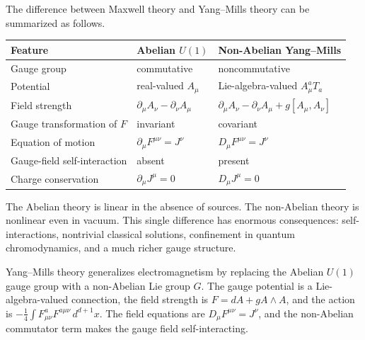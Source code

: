 The difference between Maxwell theory and Yang--Mills theory can be summarized
as follows.

\begin{center}
\begin{tabular}{lll}
\toprule
Feature & Abelian \(U(1)\) & Non-Abelian Yang--Mills \\
\midrule
Gauge group & commutative & noncommutative \\
Potential & real-valued \(A_\mu\) & Lie-algebra-valued \(A_\mu^aT_a\) \\
Field strength & \(\partial_\mu A_\nu-\partial_\nu A_\mu\) & \(\partial_\mu A_\nu-\partial_\nu A_\mu+g[A_\mu,A_\nu]\) \\
Gauge transformation of \(F\) & invariant & covariant \\
Equation of motion & \(\partial_\mu F^{\mu\nu}=J^\nu\) & \(D_\mu F^{\mu\nu}=J^\nu\) \\
Gauge-field self-interaction & absent & present \\
Charge conservation & \(\partial_\mu J^\mu=0\) & \(D_\mu J^\mu=0\) \\
\bottomrule
\end{tabular}
\end{center}

The Abelian theory is linear in the absence of sources. The non-Abelian theory
is nonlinear even in vacuum. This single difference has enormous consequences:
self-interactions, nontrivial classical solutions, confinement in quantum
chromodynamics, and a much richer gauge structure.

\begin{summarybox}
Yang--Mills theory generalizes electromagnetism by replacing the Abelian
\(U(1)\) gauge group with a non-Abelian Lie group \(G\). The gauge potential is a
Lie-algebra-valued connection, the field strength is
\(F=dA+gA\wedge A\), and the action is
\(-\frac{1}{4}\int F_{\mu\nu}^aF^{a\mu\nu}\,d^{d+1}x\). The field equations are
\(D_\mu F^{\mu\nu}=J^\nu\), and the non-Abelian commutator term makes the gauge
field self-interacting.
\end{summarybox}
